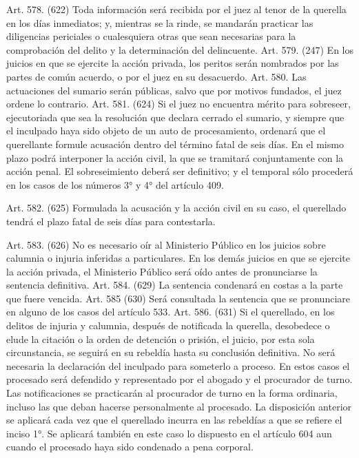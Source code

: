     Art. 578. (622) Toda información será recibida por el juez al tenor de la querella en los días inmediatos;
y, mientras se la rinde, se mandarán practicar las diligencias periciales o cualesquiera otras que sean necesarias para la comprobación del delito y la determinación del delincuente.
    Art. 579. (247) En los juicios en que se ejercite la acción privada, los peritos serán nombrados por las partes de común acuerdo, o por el juez en su desacuerdo.
    Art. 580. Las actuaciones del sumario serán públicas, salvo que por motivos fundados, el juez ordene lo contrario.
    Art. 581. (624) Si el juez no encuentra mérito para sobreseer, ejecutoriada que sea la resolución que declara cerrado el sumario, y siempre que el inculpado haya sido objeto de un auto de procesamiento, ordenará que el querellante formule acusación dentro del término fatal de seis días. En el mismo plazo podrá interponer la acción civil, la que se tramitará conjuntamente con la acción penal.
    El sobreseimiento deberá ser definitivo; y el temporal sólo procederá en los casos de los números 3° y 4° del artículo 409.

    Art. 582. (625) Formulada la acusación y la acción civil en su caso, el querellado tendrá el plazo fatal de seis días para contestarla.


    Art. 583. (626) No es necesario oír al Ministerio Público en los juicios sobre calumnia o injuria inferidas a particulares. En los demás juicios en que se ejercite la acción privada, el Ministerio Público será oído antes de pronunciarse la sentencia definitiva.
    Art. 584. (629) La sentencia condenará en costas a la parte que fuere vencida.
    Art. 585 (630) Será consultada la sentencia que se pronunciare en alguno de los casos del artículo 533.
    Art. 586. (631) Si el querellado, en los delitos de injuria y calumnia, después de notificada la querella, desobedece o elude la citación o la orden de detención o prisión, el juicio, por esta sola circunstancia, se seguirá en su rebeldía hasta su conclusión definitiva.
    No será necesaria la declaración del inculpado para someterlo a proceso.
    En estos casos el procesado será defendido y representado por el abogado y el procurador de turno.
    Las notificaciones se practicarán al procurador de turno en la forma ordinaria, incluso las que deban hacerse personalmente al procesado.
    La disposición anterior se aplicará cada vez que el querellado incurra en las rebeldías a que se refiere el inciso 1°.
    Se aplicará también en este caso lo dispuesto en el artículo 604 aun cuando el procesado haya sido condenado a pena corporal.


